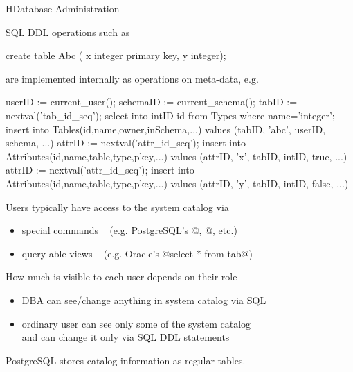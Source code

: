 \begin{lecture}{H}{Database Administration}
\begin{slide}
SQL DDL operations such as
\begin{indent}
\begin{small}
\begin{session}
    create table Abc (
        x integer primary key,
        y integer);
\end{session}
\end{small}
\end{indent}
are implemented internally as operations on meta-data, e.g.
\begin{indent}
\begin{small}
\begin{session}
    userID := current_user();
    schemaID := current_schema();
    tabID := nextval('tab_id_seq');
    select into intID id
    from Types where name='integer';
    insert into Tables(id,name,owner,inSchema,...)
           values (tabID, 'abc', userID, schema, ...)
    attrID := nextval('attr_id_seq');
    insert into Attributes(id,name,table,type,pkey,...)
           values (attrID, 'x', tabID, intID, true, ...)
    attrID := nextval('attr_id_seq');
    insert into Attributes(id,name,table,type,pkey,...)
           values (attrID, 'y', tabID, intID, false, ...)
\end{session}
\end{small}
\end{indent}
\end{slide}

\begin{slide}
Users typically have access to the system catalog via
\begin{itemize}
\item special commands ~
	(e.g. PostgreSQL's @\d@, @\df@, etc.)
\item query-able views ~
	(e.g. Oracle's @select * from tab@)
\end{itemize}
How much is visible to each user depends on their role
\begin{itemize}
\item DBA can see/change anything in system catalog via SQL
\item ordinary user can see only some of the system catalog \\
	and can change it only via SQL DDL statements
\end{itemize}
\end{slide}

\begin{slide}
PostgreSQL stores catalog information as regular tables.


\end{slide}
\end{lecture}
